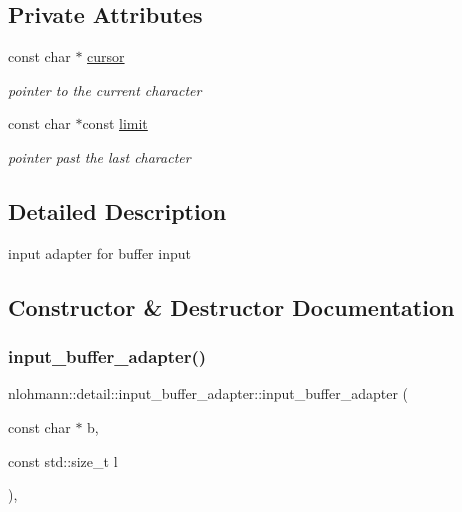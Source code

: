 \subsection*{Private Attributes}
\begin{DoxyCompactItemize}
\item 
const char $\ast$ \mbox{\hyperlink{classnlohmann_1_1detail_1_1input__buffer__adapter_a49e6c8b6555af489a45ef51737eafa1c}{cursor}}
\begin{DoxyCompactList}\small\item\em pointer to the current character \end{DoxyCompactList}\item 
const char $\ast$const \mbox{\hyperlink{classnlohmann_1_1detail_1_1input__buffer__adapter_abbea9cdb1862e55bc1e142a72a947da4}{limit}}
\begin{DoxyCompactList}\small\item\em pointer past the last character \end{DoxyCompactList}\end{DoxyCompactItemize}


\subsection{Detailed Description}
input adapter for buffer input 

\subsection{Constructor \& Destructor Documentation}
\mbox{\label{classnlohmann_1_1detail_1_1input__buffer__adapter_ad9b912fabdcb53de255e8c444d625ac3}} 
\subsubsection{\texorpdfstring{input\_buffer\_adapter()}{input\_buffer\_adapter()}\hspace{0.1cm}{\footnotesize\ttfamily [1/3]}}
{\footnotesize\ttfamily nlohmann\+::detail\+::input\+\_\+buffer\+\_\+adapter\+::input\+\_\+buffer\+\_\+adapter (\begin{DoxyParamCaption}\item[{const char $\ast$}]{b,  }\item[{const std\+::size\+\_\+t}]{l }\end{DoxyParamCaption})\hspace{0.3cm}{\ttfamily [inline]}, {\ttfamily [noexcept]}}

